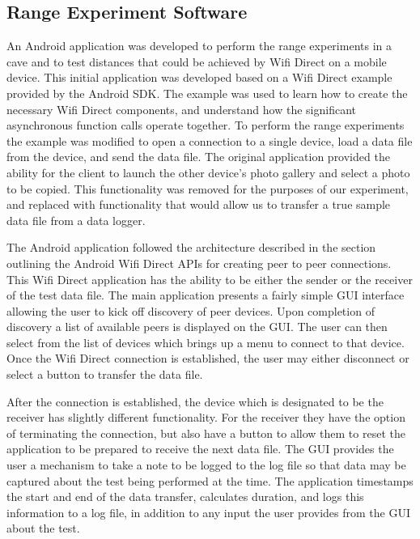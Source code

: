 \documentclass[10pt,twocolumn]{article}
\begin{document}

\subsection{Range Experiment Software}
An Android application was developed to perform the range experiments in a cave and to test distances that could be achieved by Wifi Direct on a mobile device.
This initial application was developed based on a Wifi Direct example provided by the Android SDK.
The example was used to learn how to create the necessary Wifi Direct components, and understand how the significant asynchronous function calls operate together.
To perform the range experiments the example was modified to open a connection to a single device, load a data file from the device, and send the data file. 
The original application provided the ability for the client to launch the other device's photo gallery and select a photo to be copied.
This functionality was removed for the purposes of our experiment, and replaced with functionality that would allow us to transfer a true sample data file from a data logger.

The Android application followed the architecture described in the section outlining the Android Wifi Direct APIs for creating peer to peer connections. 
This Wifi Direct application has the ability to be either the sender or the receiver of the test data file.
The main application presents a fairly simple GUI interface allowing the user to kick off discovery of peer devices. 
Upon completion of discovery a list of available peers is displayed on the GUI.
The user can then select from the list of devices which brings up a menu to connect to that device.
Once the Wifi Direct connection is established, the user may either disconnect or select a button to transfer the data file.

After the connection is established, the device which is designated to be the receiver has slightly different functionality.
For the receiver they have the option of terminating the connection, but also have a button to allow them to reset the application to be prepared to receive the next data file.
The GUI provides the user a mechanism to take a note to be logged to the log file so that data may be captured about the test being performed at the time.
The application timestamps the start and end of the data transfer, calculates duration, and logs this information to a log file, in addition to any input the user provides from the GUI about the test.
\end{document}
